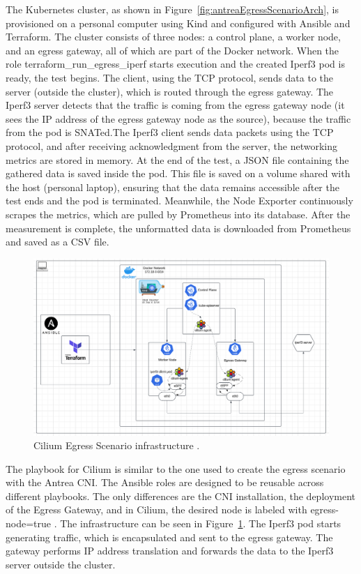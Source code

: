 The Kubernetes cluster, as shown in Figure~\ref{fig:antreaEgressScenarioArch}, is provisioned on a personal computer using Kind and configured with Ansible and Terraform. The cluster consists of three nodes: a control plane, a worker node, and an egress gateway, all of which are part of the Docker network. When the role terraform\_run\_egress\_iperf starts execution and the created Iperf3 pod is ready, the test begins. The client, using the TCP protocol, sends data to the server (outside the cluster), which is routed through the egress gateway. The Iperf3 server detects that the traffic is coming from the egress gateway node (it sees the IP address of the egress gateway node as the source), because the traffic from the pod is SNATed.The Iperf3 client sends data packets using the TCP protocol, and after receiving acknowledgment from the server, the networking metrics are stored in memory. At the end of the test, a JSON file containing the gathered data is saved inside the pod. This file is saved on a volume shared with the host (personal laptop), ensuring that the data remains accessible after the test ends and the pod is terminated. Meanwhile, the Node Exporter continuously scrapes the metrics, which are pulled by Prometheus into its database. After the measurement is complete, the unformatted data is downloaded from Prometheus and saved as a CSV file. 

\begin{figure}[H]
  \centering
  \includegraphics[width=1\columnwidth]{images/cilium_egress_gatateway_cluster.png}
  \caption{Cilium Egress Scenario infrastructure \cite{CiliumDocs}.}
  \label{fig:ciliumEgressGatewayScenarioArch}
\end{figure}

The playbook for Cilium is similar to the one used to create the egress scenario with the Antrea CNI. The Ansible roles are designed to be reusable across different playbooks. The only differences are the CNI installation, the deployment of the Egress Gateway, and in Cilium, the desired node is labeled with egress-node=true \cite{CiliumDocs}. The infrastructure can be seen in Figure~\ref{fig:ciliumEgressGatewayScenarioArch}. The Iperf3 pod starts generating traffic, which is encapsulated and sent to the egress gateway. The gateway performs IP address translation and forwards the data to the Iperf3 server outside the cluster.


